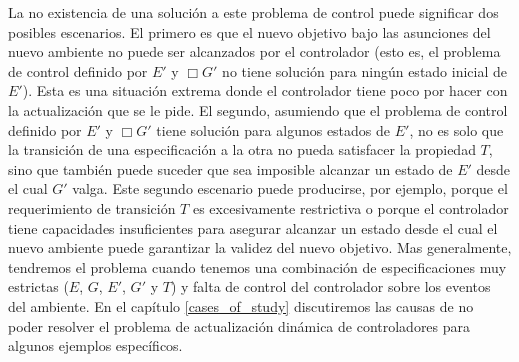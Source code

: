 La no existencia de una solución a este problema de control puede significar dos posibles escenarios. El primero es que
el nuevo objetivo bajo las asunciones del nuevo ambiente no puede ser alcanzados por el controlador (esto es, el
problema de control definido por $E'$ y $\Box G'$ no tiene solución para ningún estado inicial de $E'$). Esta es una
situación extrema donde el controlador tiene poco por hacer con la actualización que se le pide. El segundo, asumiendo
que el problema de control definido por $E'$ y $\Box G'$ tiene solución para algunos estados de $E'$, no es solo que la
transición de una especificación a la otra no pueda satisfacer la propiedad $T$, sino que también puede suceder que sea
imposible alcanzar un estado de $E'$ desde el cual $G'$ valga. Este segundo escenario puede producirse, por ejemplo,
porque el requerimiento de transición $T$ es excesivamente restrictiva o porque el controlador tiene capacidades
insuficientes para asegurar alcanzar un estado desde el cual el nuevo ambiente puede garantizar la validez del nuevo
objetivo. Mas generalmente, tendremos el problema cuando tenemos una combinación de especificaciones muy estrictas ($E$,
$G$, $E'$, $G'$ y $T$) y falta de control del controlador sobre los eventos del ambiente. En el capítulo \ref{cases_of_study}
discutiremos las causas de no poder resolver el problema de actualización dinámica de controladores para algunos
ejemplos específicos.
